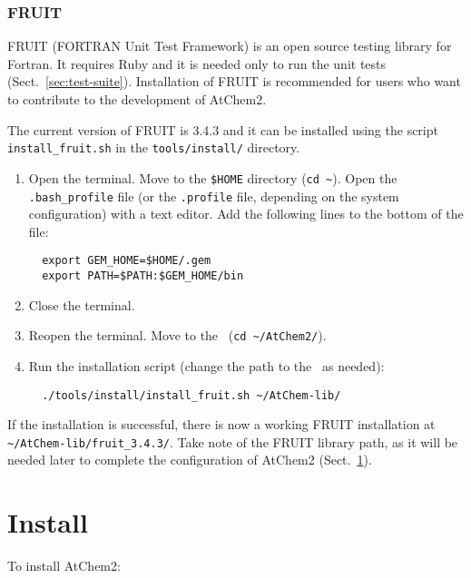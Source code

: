 \subsubsection{FRUIT}

FRUIT (FORTRAN Unit Test Framework) is an open source testing library
for Fortran. It requires Ruby and it is needed only to run the unit
tests (Sect.~\ref{sec:test-suite}). Installation of FRUIT is
recommended for users who want to contribute to the development of
AtChem2.

The current version of FRUIT is 3.4.3 and it can be installed using
the script \texttt{install\_fruit.sh} in the \texttt{tools/install/}
directory.

\begin{enumerate}
\item Open the terminal. Move to the \texttt{\$HOME} directory
  (\texttt{cd\ \textasciitilde}). Open the \texttt{.bash\_profile}
  file (or the \texttt{.profile} file, depending on the system
  configuration) with a text editor. Add the following lines to the
  bottom of the file:
  \begin{verbatim}
  export GEM_HOME=$HOME/.gem
  export PATH=$PATH:$GEM_HOME/bin
  \end{verbatim}
\item Close the terminal.
\item Reopen the terminal. Move to the \maindir\ (\verb|cd ~/AtChem2/|).
\item Run the installation script (change the path to the \depdir\ as
  needed):
  \begin{verbatim}
  ./tools/install/install_fruit.sh ~/AtChem-lib/
  \end{verbatim}
\end{enumerate}

If the installation is successful, there is now a working FRUIT
installation at \texttt{\textasciitilde/AtChem-lib/fruit\_3.4.3/}.
Take note of the FRUIT library path, as it will be needed later to
complete the configuration of AtChem2 (Sect.~\ref{sec:install}).


\section{Install} \label{sec:install}

To install AtChem2:

